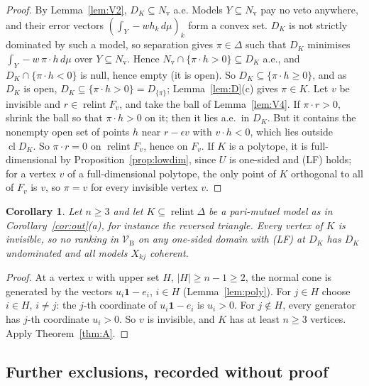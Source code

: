 \documentclass[11pt]{article}
\newcommand{\one}{\mathbf{1}}
\newcommand{\VBB}{\mathcal{V}_{\mathrm B}}
\DeclareMathOperator{\relint}{relint}
\DeclareMathOperator{\cl}{cl}
\theoremstyle{plain}
\newtheorem{corollary}[theorem]{Corollary}
\theoremstyle{definition}
\theoremstyle{remark}
\begin{document}
\begin{proof}
By Lemma~\ref{lem:V2}, $D_K\subseteq N_{\mathrm v}$ a.e. Models $Y\subseteq N_{\mathrm v}$
pay no veto anywhere, and their error vectors $(\int_Y-wh_k\,d\mu)_k$ form a convex set.
$D_K$ is not strictly dominated by such a model, so separation gives $\pi\in\Delta$ such
that $D_K$ minimises $\int_Y-w\,\pi\cdot h\,d\mu$ over $Y\subseteq N_{\mathrm v}$. Hence
$N_{\mathrm v}\cap\{\pi\cdot h>0\}\subseteq D_K$ a.e., and $D_K\cap\{\pi\cdot h<0\}$ is null,
hence empty (it is open). So $D_K\subseteq\{\pi\cdot h\ge0\}$, and as $D_K$ is open,
$D_K\subseteq\{\pi\cdot h>0\}=D_{\{\pi\}}$; Lemma~\ref{lem:D}(c) gives $\pi\in K$. Let $v$ be invisible and $r\in\relint F_v$, and take the ball of
Lemma~\ref{lem:V4}. If $\pi\cdot r>0$, shrink the ball so that $\pi\cdot h>0$ on it; then it
lies a.e.\ in $D_K$. But it contains the nonempty open set of points $h$ near $r-\epsilon v$
with $v\cdot h<0$, which lies outside $\cl D_K$. So $\pi\cdot r=0$ on $\relint F_v$, hence on
$F_v$. If $K$ is a polytope, it is full-dimensional by Proposition~\ref{prop:lowdim}, since $U$ is
one-sided and (LF) holds; for a vertex $v$ of a full-dimensional polytope, the only point
of $K$ orthogonal to all of $F_v$ is $v$, so $\pi=v$ for every invisible vertex $v$.
\end{proof}

\begin{corollary}\label{cor:Apmm}
Let $n\ge3$ and let $K\subseteq\relint\Delta$ be a pari-mutuel model as in
Corollary~\ref{cor:out}(a), for instance the reversed triangle. Every vertex of $K$ is
invisible, so no ranking in $\VBB$ on any one-sided domain with (LF) at $D_K$ has $D_K$
undominated and all models $X_{kj}$ coherent.
\end{corollary}

\begin{proof}
At a vertex $v$ with upper set $H$, $|H|\ge n-1\ge2$, the normal cone is generated by the
vectors $u_i\one-e_i$, $i\in H$ (Lemma~\ref{lem:poly}). For $j\in H$ choose $i\in H$,
$i\ne j$: the $j$-th coordinate of $u_i\one-e_i$ is $u_i>0$. For $j\notin H$, every
generator has $j$-th coordinate $u_i>0$. So $v$ is invisible, and $K$ has at least $n\ge3$
vertices. Apply Theorem~\ref{thm:A}.
\end{proof}

\subsection{Further exclusions, recorded without proof}\label{sec:excl-other}
\end{document}
